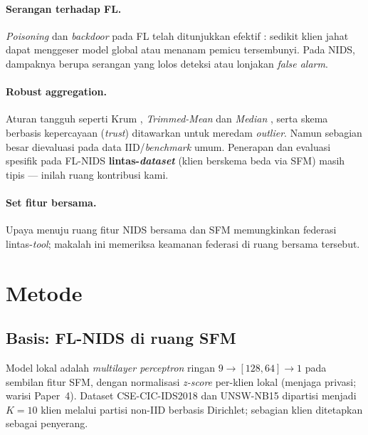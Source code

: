 \documentclass[11pt,a4paper]{article}
\begin{document}
\paragraph{Serangan terhadap FL.} \emph{Poisoning} dan \emph{backdoor} pada FL
telah ditunjukkan efektif \cite{fbackdoor,fbagdasaryan,ffung}: sedikit klien jahat
dapat menggeser model global atau menanam pemicu tersembunyi. Pada NIDS, dampaknya
berupa serangan yang lolos deteksi atau lonjakan \emph{false alarm}.

\paragraph{Robust aggregation.} Aturan tangguh seperti Krum \cite{fkrum},
\emph{Trimmed-Mean} dan \emph{Median} \cite{ftrimmed}, serta skema berbasis
kepercayaan (\emph{trust}) ditawarkan untuk meredam \emph{outlier}. Namun sebagian
besar dievaluasi pada data IID/\emph{benchmark} umum. Penerapan dan evaluasi
spesifik pada FL-NIDS \textbf{lintas-\emph{dataset}} (klien berskema beda via SFM)
masih tipis --- inilah ruang kontribusi kami.

\paragraph{Set fitur bersama.} Upaya menuju ruang fitur NIDS bersama
\cite{sarhan} dan SFM \cite{sfm} memungkinkan federasi lintas-\emph{tool}; makalah
ini memeriksa keamanan federasi di ruang bersama tersebut.

\FloatBarrier
\section{Metode}
\label{sec:method}

\subsection{Basis: FL-NIDS di ruang SFM}
\label{sec:base}
Model lokal adalah \emph{multilayer perceptron} ringan $9\!\rightarrow\![128,64]\!\rightarrow\!1$
pada sembilan fitur SFM, dengan normalisasi \emph{z-score} per-klien lokal
(menjaga privasi; warisi Paper~4). Dataset CSE-CIC-IDS2018 \cite{cicids} dan
UNSW-NB15 \cite{unsw} dipartisi menjadi $K{=}10$ klien melalui partisi non-IID
berbasis Dirichlet; sebagian klien ditetapkan sebagai penyerang.
\end{document}
